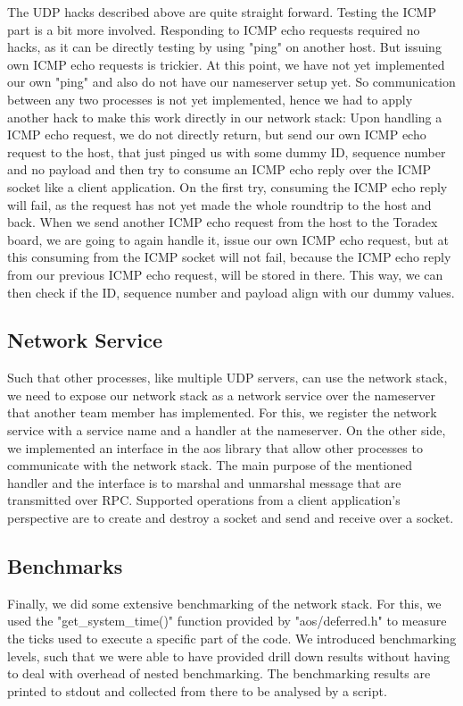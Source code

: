 The UDP hacks described above are quite straight forward. Testing the ICMP part is a bit more involved. Responding to ICMP echo requests required no hacks, as it can be directly testing by using "ping" on another host.
But issuing own ICMP echo requests is trickier. At this point, we have not yet implemented our own "ping" and also do not have our nameserver setup yet. So communication between any two processes is not yet implemented, hence we had to apply another hack to make this work directly in our network stack:
Upon handling a ICMP echo request, we do not directly return, but send our own ICMP echo request to the host, that just pinged us with some dummy ID, sequence number and no payload and then try to consume an ICMP echo reply over the ICMP socket like a client application. On the first try, consuming the ICMP echo reply will fail, as the request has not yet made the whole roundtrip to the host and back. When we send another ICMP echo request from the host to the Toradex board, we are going to again handle it, issue our own ICMP echo request, but at this consuming from the ICMP socket will not fail, because the ICMP echo reply from our previous ICMP echo request, will be stored in there. This way, we can then check if the ID, sequence number and payload align with our dummy values.

\subsection{Network Service}

Such that other processes, like multiple UDP servers, can use the network stack, we need to expose our network stack as a network service over the nameserver that another team member has implemented. 
For this, we register the network service with a service name and a handler at the nameserver. On the other side, we implemented an interface in the aos library that allow other processes to communicate with the network stack. The main purpose of the mentioned handler and the interface is to marshal and unmarshal message that are transmitted over RPC.
Supported operations from a client application's perspective are to create and destroy a socket and send and receive over a socket.

\subsection{Benchmarks}

Finally, we did some extensive benchmarking of the network stack. For this, we used the "get\_system\_time()" function provided by "aos/deferred.h" to measure the ticks used to execute a specific part of the code. We introduced benchmarking levels, such that we were able to have provided drill down results without having to deal with overhead of nested benchmarking.
The benchmarking results are printed to stdout and collected from there to be analysed by a script.

